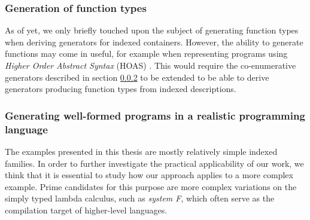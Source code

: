 \documentclass[a4paper,msc,twosized=semi]{uustthesis}
\begin{document}
\subsubsection{Generation of function types}

  As of yet, we only briefly touched upon the subject of generating function types 
  when deriving generators for indexed containers. However, the ability to generate 
  functions may come in useful, for example when representing programs using \emph
  {Higher Order Abstract Syntax} (HOAS) \cite{pfenning1988higher}. This would require 
  the co-enumerative generators described in section \ref{} to be extended to be able 
  to derive generators producing function types from indexed descriptions. 

\subsubsection{Generating well-formed programs in a realistic programming language}

  The examples presented in this thesis are mostly relatively simple indexed families. 
  In order to further investigate the practical applicability of our work, we think 
  that it is essential to study how our approach applies to a more complex example. 
  Prime candidates for this purpose are more complex variations on the simply typed 
  lambda calculus, such as \emph{system F}, which often serve as the compilation 
  target of higher-level languages.


\backmatter
\listoffigures



\end{document}
